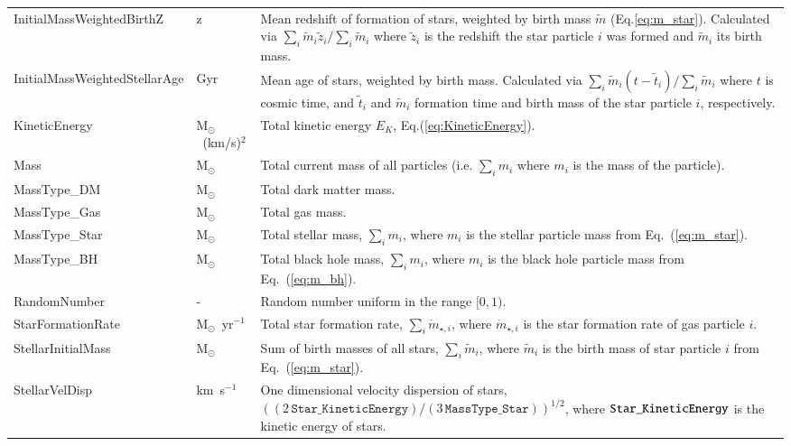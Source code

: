 \begin{table*}
\begin{center}
\begin{tabular}{ >{\ttfamily}p{4cm}p{1.5cm}p{11cm}}
InitialMassWeightedBirthZ &
z &
Mean redshift of formation of stars, weighted by birth mass $\tilde m$ (Eq.\ref{eq:m_star}). Calculated via $\sum_i \tilde {m}_{i} \tilde z_i / \sum_i \tilde {m}_{i}$ where $\tilde z_i$ is the redshift
the star particle $i$ was formed and $\tilde m_i$ its birth mass.\\

InitialMassWeightedStellarAge &
Gyr &
Mean age of stars, weighted by birth mass. Calculated via $\sum_i \tilde {m}_{i} (t - \tilde t_i) / \sum_i \tilde {m}_{i}$ where $t$ is cosmic time, and $\tilde t_i$ and $\tilde m_i$ formation time and birth mass of the star particle $i$, respectively.\\

KineticEnergy &
M$_{\odot}$~(km/s)$^{2}$ &
Total kinetic energy $E_K$, Eq.(\ref{eq:KineticEnergy}).\\

Mass &
M$_\odot$ &
Total current mass of all particles (i.e. $\sum_i m_i$ where $m_{i}$ is the mass of the particle).\\

MassType\_DM &
M$_\odot$ &
Total dark matter mass. \\

MassType\_Gas &
M$_\odot$ &
Total gas mass. \\

MassType\_Star &
M$_\odot$ &
Total stellar mass, $\sum_i m_i$, where $m_i$ is the stellar particle mass from Eq.~(\ref{eq:m_star}).\\

MassType\_BH &
M$_\odot$ &
Total black hole mass, $\sum_i m_i$, where $m_i$ is the black hole particle mass from Eq.~(\ref{eq:m_bh}).\\

RandomNumber &
- &
Random number uniform in the range $[0,1)$. \\

StarFormationRate &
M$_\odot$~yr$^{-1}$ &
Total star formation rate, $\sum_i \dot m_{\star, i}$, where $\dot m_{\star, i}$ is the star formation rate of gas particle $i$. \\

StellarInitialMass &
M$_\odot$ &
Sum of birth masses of all stars, $\sum_i \tilde{m}_{i}$, where $\tilde {m}_{i}$ is the birth mass of star particle $i$ from Eq.~(\ref{eq:m_star}).\\

StellarVelDisp &
km~s$^{-1}$ &
One dimensional velocity dispersion of stars, $((2\,\texttt{Star\_KineticEnergy})/(3\,\texttt{MassType\_Star}))^{1/2}$, where
${\tt Star\_KineticEnergy}$ is the kinetic energy of stars.\\


\end{tabular}
\end{center}
\end{table*}
